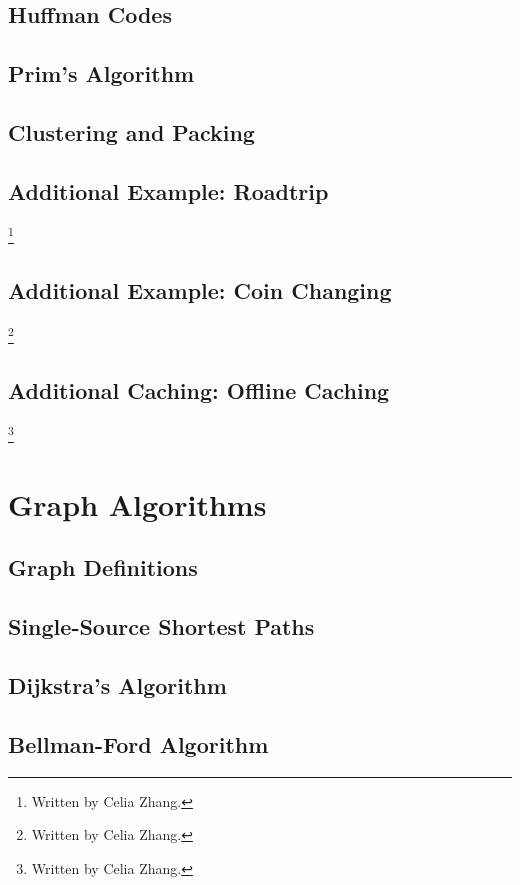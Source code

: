 \documentclass[10pt]{article}
\theoremstyle{plain}
\theoremstyle{definition}
\numberwithin{equation}{section}
\numberwithin{figure}{section}
\begin{document}
\subsection{Huffman Codes}

\subsection{Prim's Algorithm}

\subsection{Clustering and Packing}

\subsection{Additional Example: Roadtrip}\footnote{Written by Celia Zhang.}

\subsection{Additional Example: Coin Changing}\footnote{Written by Celia Zhang.}

\subsection{Additional Caching: Offline Caching}\footnote{Written by Celia Zhang.}

\newpage
\section{Graph Algorithms}

\subsection{Graph Definitions}

\subsection{Single-Source Shortest Paths}

\subsection{Dijkstra's Algorithm}

\subsection{Bellman-Ford Algorithm}
\end{document}
